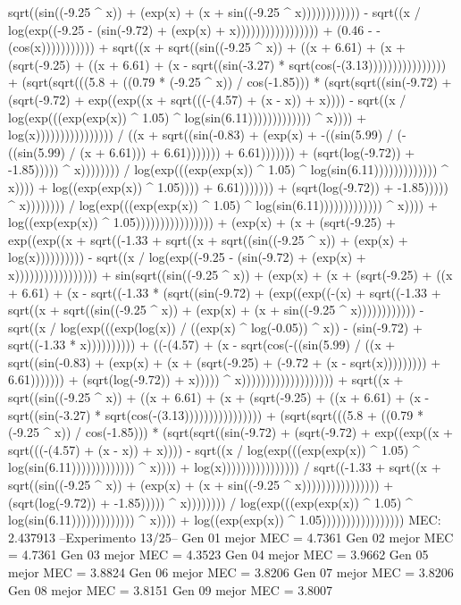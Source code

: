 sqrt((sin((-9.25 ^ x)) + (exp(x) + (x + sin((-9.25 ^ x)))))))))))) - sqrt((x / log(exp((-9.25 - (sin(-9.72) + (exp(x) + x))))))))))))))))) + (0.46 - -(cos(x))))))))))) + sqrt((x + sqrt((sin((-9.25 ^ x)) + ((x + 6.61) + (x + (sqrt(-9.25) + ((x + 6.61) + (x - sqrt((sin(-3.27) * sqrt(cos(-(3.13)))))))))))))))) + (sqrt(sqrt(((5.8 + ((0.79 * (-9.25 ^ x)) / cos(-1.85))) * (sqrt(sqrt((sin(-9.72) + (sqrt(-9.72) + exp((exp((x + sqrt(((-(4.57) + (x - x)) + x)))) - sqrt((x / log(exp(((exp(exp(x)) ^ 1.05) ^ log(sin(6.11))))))))))))) ^ x)))) + log(x)))))))))))))))) / ((x + sqrt((sin(-0.83) + (exp(x) + -((sin(5.99) / (-((sin(5.99) / (x + 6.61))) + 6.61))))))) + 6.61))))))) + (sqrt(log(-9.72)) + -1.85))))) ^ x)))))))) / log(exp(((exp(exp(x)) ^ 1.05) ^ log(sin(6.11))))))))))))) ^ x)))) + log((exp(exp(x)) ^ 1.05)))) + 6.61))))))) + (sqrt(log(-9.72)) + -1.85))))) ^ x)))))))) / log(exp(((exp(exp(x)) ^ 1.05) ^ log(sin(6.11))))))))))))) ^ x)))) + log((exp(exp(x)) ^ 1.05)))))))))))))))) + (exp(x) + (x + (sqrt(-9.25) + exp((exp((x + sqrt((-1.33 + sqrt((x + sqrt((sin((-9.25 ^ x)) + (exp(x) + log(x)))))))))) - sqrt((x / log(exp((-9.25 - (sin(-9.72) + (exp(x) + x))))))))))))))))) + sin(sqrt((sin((-9.25 ^ x)) + (exp(x) + (x + (sqrt(-9.25) + ((x + 6.61) + (x - sqrt((-1.33 * (sqrt((sin(-9.72) + (exp((exp((-(x) + sqrt((-1.33 + sqrt((x + sqrt((sin((-9.25 ^ x)) + (exp(x) + (x + sin((-9.25 ^ x)))))))))))) - sqrt((x / log(exp(((exp(log(x)) / ((exp(x) ^ log(-0.05)) ^ x)) - (sin(-9.72) + sqrt((-1.33 * x)))))))))) + ((-(4.57) + (x - sqrt(cos(-((sin(5.99) / ((x + sqrt((sin(-0.83) + (exp(x) + (x + (sqrt(-9.25) + (-9.72 + (x - sqrt(x))))))))) + 6.61))))))) + (sqrt(log(-9.72)) + x))))) ^ x))))))))))))))))))) + sqrt((x + sqrt((sin((-9.25 ^ x)) + ((x + 6.61) + (x + (sqrt(-9.25) + ((x + 6.61) + (x - sqrt((sin(-3.27) * sqrt(cos(-(3.13)))))))))))))))) + (sqrt(sqrt(((5.8 + ((0.79 * (-9.25 ^ x)) / cos(-1.85))) * (sqrt(sqrt((sin(-9.72) + (sqrt(-9.72) + exp((exp((x + sqrt(((-(4.57) + (x - x)) + x)))) - sqrt((x / log(exp(((exp(exp(x)) ^ 1.05) ^ log(sin(6.11))))))))))))) ^ x)))) + log(x)))))))))))))))) / sqrt((-1.33 + sqrt((x + sqrt((sin((-9.25 ^ x)) + (exp(x) + (x + sin((-9.25 ^ x)))))))))))))))) + (sqrt(log(-9.72)) + -1.85))))) ^ x)))))))) / log(exp(((exp(exp(x)) ^ 1.05) ^ log(sin(6.11))))))))))))) ^ x)))) + log((exp(exp(x)) ^ 1.05)))))))))))))))))
MEC: 2.437913
--Experimento 
 13/25--
Gen 01 mejor MEC = 4.7361
Gen 02 mejor MEC = 4.7361
Gen 03 mejor MEC = 4.3523
Gen 04 mejor MEC = 3.9662
Gen 05 mejor MEC = 3.8824
Gen 06 mejor MEC = 3.8206
Gen 07 mejor MEC = 3.8206
Gen 08 mejor MEC = 3.8151
Gen 09 mejor MEC = 3.8007
